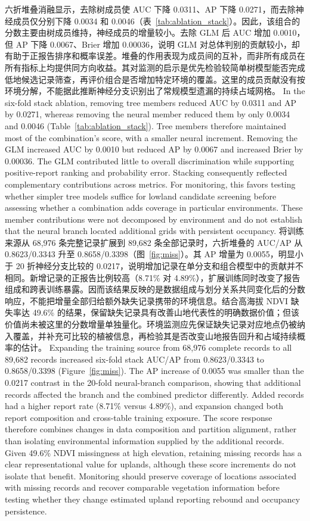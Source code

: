 \ifzh
六折堆叠消融显示，去除树成员使 AUC 下降 0.0311、AP 下降 0.0271，而去除神经成员仅分别下降 0.0034 和 0.0046（表~\ref{tab:ablation_stack}）。因此，该组合的分数主要由树成员维持，神经成员的增量较小。去除 GLM 后 AUC 增加 0.0010，但 AP 下降 0.0067、Brier 增加 0.00036，说明 GLM 对总体判别的贡献较小，却有助于正报告排序和概率误差。堆叠的作用表现为成员间的互补，而非所有成员在所有指标上均提供同方向收益。其对监测的启示是优先检验较简单树模型能否完成低地候选记录筛查，再评价组合是否增加特定环境的覆盖。这里的成员贡献没有按环境分解，不能据此推断神经分支识别出了常规模型遗漏的持续占域网格。
\else
In the six-fold stack ablation, removing tree members reduced AUC by 0.0311 and AP by 0.0271, whereas removing the neural member reduced them by only 0.0034 and 0.0046 (Table~\ref{tab:ablation_stack}). Tree members therefore maintained most of the combination's score, with a smaller neural increment. Removing the GLM increased AUC by 0.0010 but reduced AP by 0.0067 and increased Brier by 0.00036. The GLM contributed little to overall discrimination while supporting positive-report ranking and probability error. Stacking consequently reflected complementary contributions across metrics. For monitoring, this favors testing whether simpler tree models suffice for lowland candidate screening before assessing whether a combination adds coverage in particular environments. These member contributions were not decomposed by environment and do not establish that the neural branch located additional grids with persistent occupancy.
\fi
{}
\ifzh
将训练来源从 68,976 条完整记录扩展到 89,682 条全部记录时，六折堆叠的 AUC/AP 从 0.8623/0.3343 升至 0.8658/0.3398（图~\ref{fig:miss}）。其 AP 增量为 0.0055，明显小于 20 折神经分支比较的 0.0217，说明增加记录在单分支和组合模型中的贡献并不相同。新增记录的正报告比例较高（8.71\% 对 4.89\%），扩展训练同时改变了报告组成和跨表训练暴露。因而该结果反映的是数据组成与划分关系共同变化后的分数响应，不能把增量全部归给额外缺失记录携带的环境信息。结合高海拔 NDVI 缺失率达 49.6\% 的结果，保留缺失记录具有改善山地代表性的明确数据价值；但该价值尚未被这里的分数增量单独量化。环境监测应先保证缺失记录对应地点仍被纳入覆盖，并补充可比较的植被信息，再检验其是否改变山地报告回升和占域持续概率的估计。
\else
Expanding the training source from 68,976 complete records to all 89,682 records increased six-fold stack AUC/AP from 0.8623/0.3343 to 0.8658/0.3398 (Figure~\ref{fig:miss}). The AP increase of 0.0055 was smaller than the 0.0217 contrast in the 20-fold neural-branch comparison, showing that additional records affected the branch and the combined predictor differently. Added records had a higher report rate (8.71\% versus 4.89\%), and expansion changed both report composition and cross-table training exposure. The score response therefore combines changes in data composition and partition alignment, rather than isolating environmental information supplied by the additional records. Given 49.6\% NDVI missingness at high elevation, retaining missing records has a clear representational value for uplands, although these score increments do not isolate that benefit. Monitoring should preserve coverage of locations associated with missing records and recover comparable vegetation information before testing whether they change estimated upland reporting rebound and occupancy persistence.
